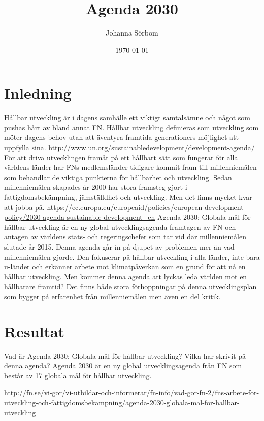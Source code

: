 \documentclass{report}
\title{Agenda 2030}
\date{\today}
\author{Johanna Sörbom}
\begin{document}
\maketitle
\newpage
\tableofcontents
\newpage
\section{Inledning}
Hållbar utveckling är i dagens samhälle ett viktigt samtalsämne och något som pushas hårt av bland annat FN. Hållbar utveckling definieras som utveckling som möter dagens behov utan att äventyra framtida generationers möjlighet att uppfylla sina.  \url{http://www.un.org/sustainabledevelopment/development-agenda/}
För att driva utvecklingen framåt på ett hållbart sätt som fungerar för alla världens länder har FNs medlemsländer tidigare kommit fram till millenniemålen som behandlar de viktiga punkterna för hållbarhet och utveckling.  Sedan millenniemålen skapades år 2000 har stora framsteg gjort i fattigdomsbekämpning, jämställdhet och utveckling. Men det finns mycket kvar att jobba på. \url{https://ec.europa.eu/europeaid/policies/european-development-policy/2030-agenda-sustainable-development_en}
Agenda 2030: Globala mål för hållbar utveckling är en ny global utvecklingsagenda framtagen av FN och antagen av världens stats- och regeringschefer som tar vid där millenniemålen slutade år 2015. Denna agenda går in på djupet av problemen mer än vad millenniemålen gjorde. Den fokuserar på hållbar utveckling i alla länder, inte bara u-länder och erkänner arbete mot klimatpåverkan som en grund för att nå en hållbar utveckling. Men kommer denna agenda att lyckas leda världen mot en hållbarare framtid? Det finns både stora förhoppningar på denna utvecklingsplan som bygger på erfarenhet från millenniemålen men även en del kritik. 

\section{Resultat}
Vad är Agenda 2030: Globala mål för hållbar utveckling? 
Vilka har skrivit på denna agenda?
Agenda 2030 är en ny global utvecklingsagenda från FN som består av 17 globala mål för hållbar utveckling. 


\url{http://fn.se/vi-gor/vi-utbildar-och-informerar/fn-info/vad-gor-fn-2/fns-arbete-for-utveckling-och-fattigdomsbekampning/agenda-2030-globala-mal-for-hallbar-utveckling} 
\end{document}
